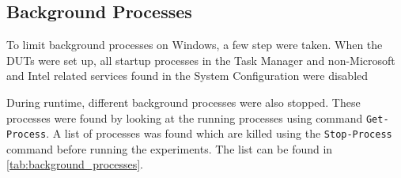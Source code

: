 

\subsection{Background Processes}\label{subsec:backgroundProcess}

To limit background processes on Windows, a few step were taken. When the DUTs were set up, all startup processes in the Task Manager and non-Microsoft and Intel related services found in the System Configuration were disabled

During runtime, different background processes were also stopped. These processes were found by looking at the running processes using command \texttt{Get-Process}. %
A list of processes was found which are killed using the \texttt{Stop-Process} command before running the experiments. The list can be found in \cref{tab:background_processes}.
